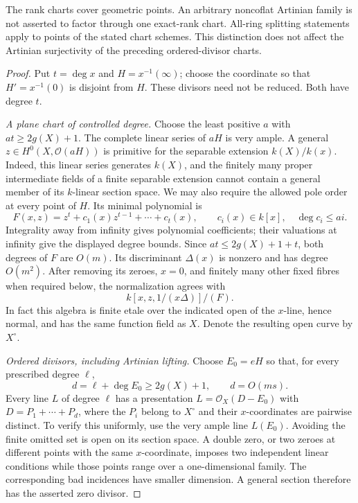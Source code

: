\begin{proposition}
The rank charts cover geometric points. An arbitrary noncoflat
Artinian family is not asserted to factor through one exact-rank
chart. All-ring splitting statements apply to points of the
stated chart schemes. This distinction does not affect the
Artinian surjectivity of the preceding ordered-divisor charts.
\end{proposition}

\begin{proof}
Put $t=\deg x$ and $H=x^{-1}(\infty)$; choose the coordinate
so that $H'=x^{-1}(0)$ is disjoint from $H$. These divisors
need not be reduced. Both have degree $t$.

\emph{A plane chart of controlled degree.}
Choose the least positive $a$ with $at\geq2g(X)+1$. The complete linear series
of $aH$ is very ample. A general $z\in H^0(X,\mathcal O(aH))$
is primitive for the separable extension $k(X)/k(x)$.
Indeed, this linear series generates $k(X)$, and the finitely
many proper intermediate fields of a finite separable extension
cannot contain a general member of its $k$-linear section space.
We may also require the allowed pole order at every point of
$H$. Its minimal polynomial is
\[
 F(x,z)=z^t+c_1(x)z^{t-1}+\cdots+c_t(x),
               \qquad c_i(x)\in k[x],\quad\deg c_i\leq ai.
                                                               \tag{B.MB.3}
\]
Integrality away from infinity gives polynomial coefficients;
their valuations at infinity give the displayed degree bounds.
Since $at\leq2g(X)+1+t$, both degrees of $F$ are $O(m)$.
Its discriminant $\Delta(x)$ is nonzero and has degree $O(m^2)$.
After removing its zeroes, $x=0$, and finitely many other fixed
fibres when required below, the normalization agrees with
\[
             k[x,z,1/(x\Delta)]/(F).                    \tag{B.MB.4}
\]
In fact this algebra is finite etale over the indicated open
of the $x$-line, hence normal, and has the same function field
as $X$. Denote the resulting open curve by $X^\circ$.

\emph{Ordered divisors, including Artinian lifting.}
Choose $E_0=eH$ so that, for every prescribed degree $\ell$,
\[
          d=\ell+\deg E_0\geq2g(X)+1,
                  \qquad d=O(ms).                       \tag{B.MB.5}
\]
Every line $L$ of degree $\ell$ has a presentation
$L=\mathcal O_X(D-E_0)$ with
$D=P_1+\cdots+P_d$, where the $P_i$ belong to $X^\circ$
and their $x$-coordinates are pairwise distinct. To verify
this uniformly, use the very ample line $L(E_0)$. Avoiding
the finite omitted set is open on its section space. A double
zero, or two zeroes at different points with the same
$x$-coordinate, imposes two independent linear conditions
while those points range over a one-dimensional family.
The corresponding bad incidences have smaller dimension.
A general section therefore has the asserted zero divisor.


\end{proof}
